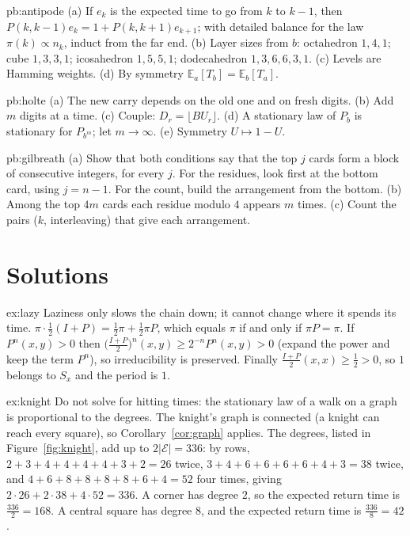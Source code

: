 \begin{hint}{pb:antipode}
(a) If $e_k$ is the expected time to go from $k$ to $k-1$, then $P(k,k-1)e_k=1+P(k,k+1)e_{k+1}$; with detailed balance for the law $\pi(k)\propto n_k$,
induct from the far end. (b) Layer sizes from $b$: octahedron $1,4,1$; cube $1,3,3,1$;
icosahedron $1,5,5,1$; dodecahedron $1,3,6,6,3,1$. (c) Levels are Hamming weights. (d) By symmetry $\mathbb E_a[T_b]=\mathbb E_b[T_a]$.
\end{hint}

\begin{hint}{pb:holte}
(a) The new carry depends on the old one and on fresh digits. (b) Add $m$ digits at a time. (c) Couple: $D_r=\lfloor BU_r\rfloor$. (d) A stationary law of
$P_b$ is stationary for $P_{b^m}$; let $m\to\infty$. (e) Symmetry $U\mapsto1-U$.
\end{hint}

\begin{hint}{pb:gilbreath}
(a) Show that both conditions say that the top $j$ cards form a block of consecutive integers, for every $j$. For the residues, look first at the
bottom card, using $j=n-1$. For the count, build the arrangement from the bottom. (b) Among the top $4m$ cards each residue modulo $4$ appears $m$ times. (c) Count the pairs ($k$, interleaving)
that give each arrangement.
\end{hint}

\section{Solutions}

\begin{solution}{ex:lazy}
\idea Laziness only slows the chain down; it cannot change where it spends its time.
\writeup $\pi\cdot\frac12(I+P)=\frac12\pi+\frac12\pi P$, which equals $\pi$ if and only if $\pi P=\pi$. If $P^n(x,y)>0$ then $\bigl(\frac{I+P}2\bigr)^n(x,y)\ge2^{-n}P^n(x,y)>0$ (expand the power and keep
the term $P^n$), so irreducibility is preserved. Finally $\frac{I+P}2(x,x)\ge\frac12>0$, so $1$ belongs to $S_x$ and the period is $1$.
\end{solution}

\begin{solution}{ex:knight}
\idea Do not solve for hitting times: the stationary law of a walk on a graph is proportional to the degrees.
\writeup The knight's graph is connected (a knight can reach every square), so Corollary~\ref{cor:graph} applies. The degrees, listed in Figure~\ref{fig:knight},
add up to $2|\mathcal E|=336$: by rows, $2+3+4+4+4+4+3+2=26$ twice, $3+4+6+6+6+6+4+3=38$ twice, and $4+6+8+8+8+8+6+4=52$ four times, giving
$2\cdot26+2\cdot38+4\cdot52=336$. A corner has degree $2$, so the expected return time is $\frac{336}2=168$. A central square has degree $8$, and the expected
return time is $\frac{336}8=42$.
\end{solution}

